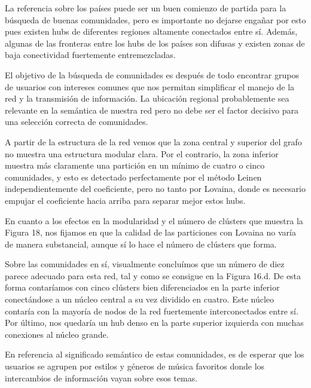 \newpage

La referencia sobre los países puede ser un buen comienzo de partida para la búsqueda de buenas comunidades, pero es importante no dejarse engañar por esto pues existen hubs de diferentes regiones altamente conectados entre sí. Además, algunas de las fronteras entre los hubs de los países son difusas y existen zonas de baja conectividad fuertemente entremezcladas.

El objetivo de la búsqueda de comunidades es después de todo encontrar grupos de usuarios con intereses comunes que nos permitan simplificar el manejo de la red y la transmisión de información. La ubicación regional probablemente sea relevante en la semántica de nuestra red pero no debe ser el factor decisivo para una selección correcta de comunidades.

\vspace{\baselineskip}

A partir de la estructura de la red vemos que la zona central y superior del grafo no muestra una estructura modular clara. Por el contrario, la zona inferior muestra más claramente una partición en un mínimo de cuatro o cinco comunidades, y esto es detectado perfectamente por el método Leinen independientemente del coeficiente, pero no tanto por Lovaina, donde es necesario empujar el coeficiente hacia arriba para separar mejor estos hubs.

\vspace{\baselineskip}

En cuanto a los efectos en la modularidad y el número de clústers que muestra la Figura 18, nos fijamos en que la calidad de las particiones con Lovaina no varía de manera substancial, aunque sí lo hace el número de clústers que forma.

\vspace{\baselineskip}

Sobre las comunidades en sí, visualmente concluímos que un número de diez parece adecuado para esta red, tal y como se consigue en la Figura 16.d. De esta forma contaríamos con cinco clústers bien diferenciados en la parte inferior conectándose a un núcleo central a su vez dividido en cuatro. Este núcleo contaría con la mayoría de nodos de la red fuertemente interconectados entre sí. Por último, nos quedaría un hub denso en la parte superior izquierda con muchas conexiones al núcleo grande.

\vspace{\baselineskip}

En referencia al significado semántico de estas comunidades, es de esperar que los usuarios se agrupen por estilos y géneros de música favoritos donde los intercambios de información vayan sobre esos temas. 

